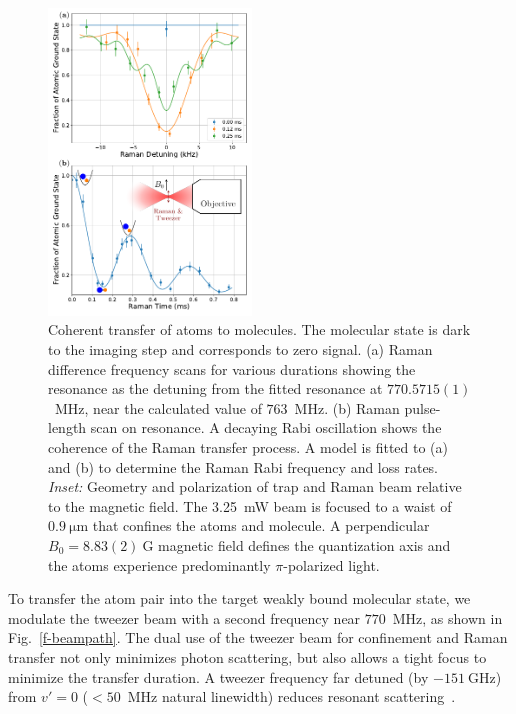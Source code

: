 \documentclass[aps,prl,twocolumn,10pt,superscriptaddress]{revtex4-1}
\newcommand{\Na}{\mathrm{Na}}
\newcommand{\Cs}{\mathrm{Cs}}
\begin{document}
\begin{figure}[t!]
  \includegraphics[width=0.48\textwidth]{imgs/fig-raman.pdf}
  \caption{Coherent transfer of atoms to molecules.  The molecular state is dark to the imaging step and corresponds to zero signal.
    (a) Raman difference frequency scans for various durations
    showing the resonance as the detuning from
    the fitted resonance at $770.5715(1)$~MHz, near the calculated value of $763$~MHz.
    (b) Raman pulse-length scan on resonance.
    A decaying Rabi oscillation shows the coherence of
    the Raman transfer process.
    A model is fitted to (a) and (b) to determine
    the Raman Rabi frequency and loss rates.
    \emph{Inset:} Geometry and polarization of trap and Raman beam relative to the magnetic field.
    The 3.25~mW beam is focused to a waist of $0.9~\mathrm{\mu m}$
    that confines the atoms and molecule.
    A perpendicular $B_0=8.83(2)~\mathrm{G}$ magnetic field
    defines the quantization axis and the atoms experience predominantly $\pi$-polarized light.
    \label{f-raman}}
\end{figure}
To transfer the atom pair into the target weakly bound molecular state,
we modulate the tweezer beam with a second frequency near $770$~MHz, as shown in Fig.~\ref{f-beampath}.
The dual use of the tweezer beam for confinement and Raman transfer not only minimizes photon scattering,
but also allows a tight focus to minimize the transfer duration. A tweezer frequency far detuned (by $-151~\mathrm{GHz}$) from $v' = 0 $ ($<50$~MHz natural linewidth) reduces resonant scattering~\cite{Liu2019}.
\end{document}
